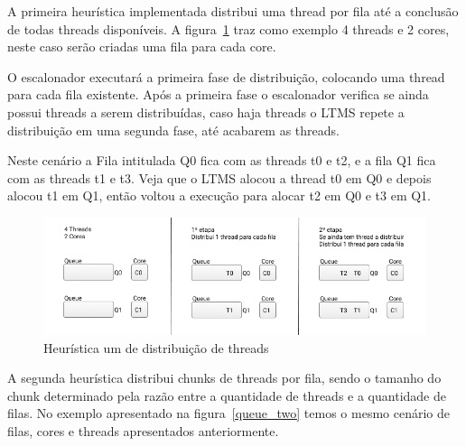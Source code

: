 \documentclass[diss,capa]{texufpel}
\begin{document}
A primeira heurística implementada distribui uma thread por fila até a conclusão de todas threads disponíveis. A figura~\ref{queue_one} traz como exemplo 4 threads e 2 cores, neste caso serão criadas uma fila para cada core.

O escalonador executará a primeira fase de distribuição, colocando uma thread para cada fila existente. Após a primeira fase o escalonador verifica se ainda possui threads a serem distribuídas, caso haja threads o LTMS repete a distribuição em uma segunda fase, até acabarem as threads.

Neste cenário a Fila intitulada Q0 fica com as threads t0 e t2, e a fila Q1 fica com as threads t1 e t3. Veja que o LTMS alocou a thread t0 em Q0 e depois alocou t1 em Q1, então voltou a execução para alocar t2 em Q0 e t3 em Q1.

\begin{figure}[htbp]
 \centering
 \includegraphics[scale=.6]{images/Queue_one.png}
\caption{Heurística um de distribuição de threads}
\label{queue_one}
\end{figure}

A segunda heurística distribui chunks de threads por fila, sendo o tamanho do chunk determinado pela razão entre a quantidade de threads e a quantidade de filas. No exemplo apresentado na figura~\ref{queue_two} temos o mesmo cenário de filas, cores e threads apresentados anteriormente.


\end{document}
